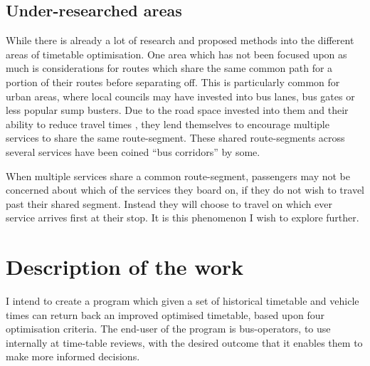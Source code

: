 \documentclass{article}
\begin{document}
\subsection{Under-researched areas}
 
While there is already a lot of research and proposed methods into the different areas of timetable optimisation. One area which has not been focused upon as much is considerations for routes which share the same common path for a portion of their routes before separating off. This is particularly common for urban areas, where local councils may have invested into bus lanes, bus gates or less popular sump busters. Due to the road space invested into them and their ability to reduce travel times \cite{RN34}, they lend themselves to encourage multiple services to share the same route-segment. These shared route-segments across several services have been coined ``bus corridors'' by some.

\par
When multiple services share a common route-segment, passengers may not be concerned about which of the services they board on, if they do not wish to travel past their shared segment. Instead they will choose to travel on which ever service arrives first at their stop. It is this phenomenon I wish to explore further.


\section{Description of the work}

I intend to create a program which given a set of historical timetable and vehicle times can return back an improved optimised timetable, based upon four optimisation criteria. The end-user of the program is bus-operators, to use internally at time-table reviews, with the desired outcome that it enables them to make more informed decisions.
\end{document}
